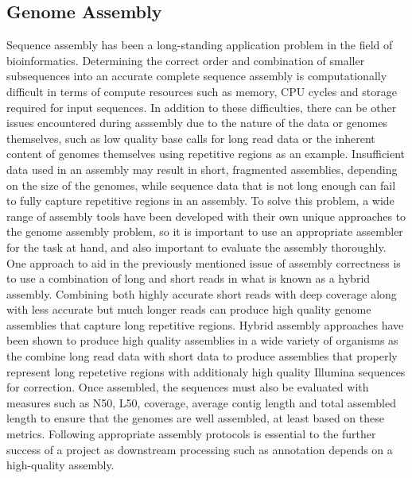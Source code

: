 \documentclass[12pt]{article}
\begin{document}
\subsection{Genome Assembly}

Sequence assembly has been a long-standing application problem in the
field of bioinformatics\cite{assembly}. Determining the correct order
and combination of smaller subsequences into an accurate complete
sequence assembly is computationally difficult in terms of compute
resources such as memory, CPU cycles and storage required for input
sequences\cite{assembly}. In addition to these difficulties, there can
be other issues encountered during asssembly due to the nature of the
data or genomes themselves, such as low quality base calls for long
read data or the inherent content of genomes themselves using
repetitive regions as an example. Insufficient data used in an
assembly may result in short, fragmented assemblies, depending on the
size of the genomes, while sequence data that is not long enough can
fail to fully capture repetitive regions in an assembly. To solve this
problem, a wide range of assembly tools have been developed with their
own unique approaches to the genome assembly problem, so it is
important to use an appropriate assembler for the task at hand, and
also important to evaluate the assembly thoroughly. One approach to
aid in the previously mentioned issue of assembly correctness is to
use a combination of long and short reads in what is known as a hybrid
assembly. Combining both highly accurate short reads with deep
coverage along with less accurate but much longer reads can produce
high quality genome assemblies that capture long repetitive
regions. Hybrid assembly approaches have been shown to produce high
quality assemblies in a wide variety of organisms as the combine long
read data with short data to produce assemblies that properly
represent long repetetive regions with additionaly high quality
Illumina sequences for correction. Once assembled, the sequences must
also be evaluated with measures such as N50, L50, coverage, average
contig length and total assembled length to ensure that the genomes
are well assembled, at least based on these
metrics\cite{assembly}. Following appropriate assembly protocols is
essential to the further success of a project as downstream processing
such as annotation depends on a high-quality assembly.
\end{document}
